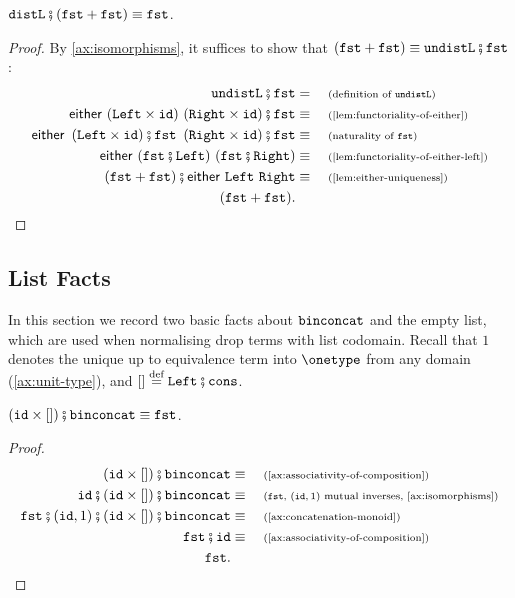 \begin{lemma}\label{lem:distl-fst-coherence}
    $\distlterm \comp (\fstterm + \fstterm) \equiv \fstterm$.
\end{lemma}
\begin{proof}
    By \cref{ax:isomorphisms}, it suffices to show that $(\fstterm + \fstterm) \equiv \undistlterm \comp \fstterm$:
    \begin{align*}
        \undistlterm \comp \fstterm &= \why{definition of $\undistlterm$} \\
        \either{(\leftterm \times \idterm)}{(\rightterm \times \idterm)} \comp \fstterm \equalbecause{\cref{lem:functoriality-of-either}} \\
        \either{\left( \leftterm \times \idterm \right) \comp \fstterm}{\left( \rightterm \times \idterm \right) \comp \fstterm} \equalbecause{naturality of $\fstterm$} \\
        \either{(\fstterm \comp \leftterm)}{(\fstterm \comp \rightterm)} \equalbecause{\cref{lem:functoriality-of-either-left}} \\
        (\fstterm + \fstterm) \comp \either{\leftterm}{\rightterm} \equalbecause{\cref{lem:either-uniqueness}} \\
        (\fstterm + \fstterm).
    \end{align*}
\end{proof}

\subsection{List Facts}\label{sec:basic-facts-about-lists}

In this section we record two basic facts about $\mathtt{binconcat}$ and the empty list, which are used when normalising drop terms with list codomain. Recall that $1$ denotes the unique up to equivalence term into $\onetype$ from any domain (\cref{ax:unit-type}), and $[] \eqdef \leftterm\comp\consterm$.

\begin{lemma}\label{lem:binconcat-empty-is-fst}
    $(\idterm \times []) \comp \binconcatterm \equiv \fstterm$.
\end{lemma}
\begin{proof}
    \begin{align*}
        (\idterm \times []) \comp \binconcatterm \equalbecause{\cref{ax:associativity-of-composition}} \\
        \idterm \comp (\idterm \times []) \comp \binconcatterm \equalbecause{$\fstterm$, $\appendoneterm$ mutual inverses, \cref{ax:isomorphisms}} \\
        \fstterm \comp \appendoneterm \comp (\idterm \times []) \comp \binconcatterm \equalbecause{\cref{ax:concatenation-monoid}} \\
        \fstterm \comp \idterm \equalbecause{\cref{ax:associativity-of-composition}} \\
        \fstterm.
    \end{align*}
\end{proof}

